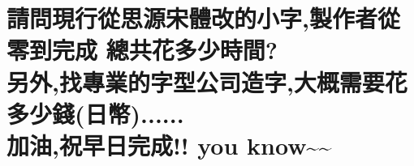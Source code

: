 %
% 
% 

\chapter[請問現行從思源宋體改的小字,製作者從零到完成 總共花多少時間? 另外,找專業的字型公司造字,大概需要花多少錢(日幣)...... 加油,祝早日完成!! you know\textasciitilde{}\textasciitilde{}]{請問現行從思源宋體改的小字,製作者從零到完成 總共花多少時間? \\[0.35em] 另外,找專業的字型公司造字,大概需要花多少錢(日幣)...... \\[0.35em] 加油,祝早日完成!! you know\textasciitilde{}\textasciitilde{}}

